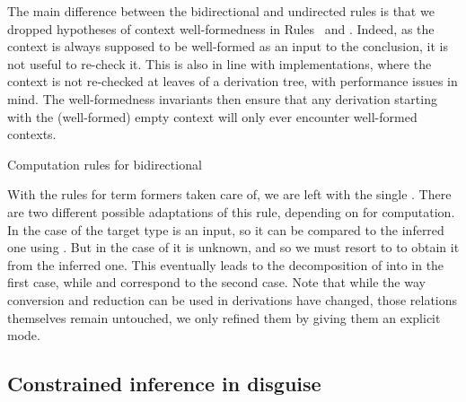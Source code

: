 The main difference between the bidirectional and undirected rules is that we dropped
hypotheses of context well-formedness in Rules~ and
. Indeed, as the context is always supposed to be well-formed
as an input to the conclusion, it is not useful to re-check it. This is also in line with implementations, where the context is not re-checked at leaves of a derivation tree, with performance issues in mind. The well-formedness invariants then ensure that any derivation starting with the (well-formed) empty context will only ever encounter well-formed contexts.

\begin{marginfigure}
\ContinuedFloat
{}
\caption{Computation rules for bidirectional }
\label{fig:bidir-ccw-other}
\end{marginfigure}

With the rules for term formers taken care of,
we are left with the single .
There are two different possible adaptations of this rule, depending on
 for computation.
In the case of  the target type is an input, so
it can be compared to the inferred one using .
But in the case of  it is unknown, and so
we must resort to  to obtain it from the inferred one.
This eventually leads to the decomposition of  into
 in the first case, while
 and  correspond to the second case.
Note that while the way conversion and reduction can be used in derivations have changed,
those relations themselves remain untouched,
we only refined them by giving them an explicit mode.

\subsection{Constrained inference in disguise}

